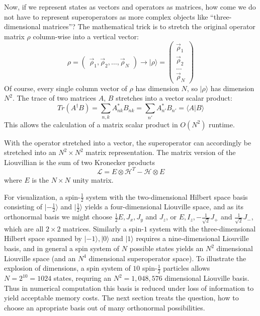 \documentclass[11.5pt,a4paper]{article}
\begin{document}
Now, if we represent states as vectors and operators as matrices, how come we do not have to represent superoperators as more complex objects like ``three-dimensional matrices''? The mathematical trick is to stretch the original operator matrix $\rho$ column-wise into a vertical vector:
\begin{equation}
 \rho = \begin{pmatrix} \vec{\rho}_1,\vec{\rho}_2,\ldots,\vec{\rho}_N \end{pmatrix} \rightarrow
  |\rho \rangle = \begin{pmatrix} \vec{\rho}_1 \\ \vec{\rho}_2 \\ \ldots \\ \vec{\rho}_N \end{pmatrix} 
\end{equation}
Of course, every single column vector of $\rho$ has dimension $N$, so $|\rho\rangle$ has dimension $N^2$. The trace of two matrices $A$, $B$ stretches into a vector scalar product:
\begin{equation}
 Tr( A^\dagger B ) = \sum_{n,k} A_{nk}^* B_{nk} = \sum_{n'} A_{n'}^* B_{n'} = \langle A | B \rangle
\end{equation}
This allows the calculation of a matrix scalar product in $O(N^2)$ runtime.

With the operator stretched into a vector, the superoperator can accordingly be stretched into an $N^2 \times N^2$ matrix representation. The matrix version of the Liouvillian is the sum of two Kronecker products
\begin{equation}
 \mathcal{L} = E \otimes \mathcal{H}^T - \mathcal{H} \otimes E
\end{equation}
where $E$ is the $N \times N$ unity matrix. 

For visualization, a spin-$\tfrac{1}{2}$ system with the two-dimensional Hilbert space basis consisting of $|-\tfrac{1}{2}\rangle$ and $|\tfrac{1}{2}\rangle$ yields a four-dimensional Liouville space, and as its orthonormal basis we might choose $\tfrac{1}{2}E, J_x, J_y$ and $J_z$, or $E, I_z, -\tfrac{1}{\sqrt{2}} J_+$ and $\tfrac{1}{\sqrt{2}} J_-$, which are all $2\times 2$ matrices. Similarly a spin-$1$ system with the three-dimensional Hilbert space spanned by $|-1\rangle, |0\rangle$ and $|1\rangle$ requires a nine-dimensional Liouville basis, and in general a spin system of $N$ possible states yields an $N^2$ dimensional Liouville space (and an $N^4$ dimensional superoperator space). To illustrate the explosion of dimensions, a spin system of $10$ spin-$\tfrac{1}{2}$ particles allows $N=2^{10} = 1024$ states, requring an $N^2 = 1,048,576$ dimensional Liouville basis. Thus in numerical computation this basis is reduced under loss of information to yield acceptable memory costs. The next section treats the question, how to choose an apropriate basis out of many orthonormal possibilities.
\end{document}

